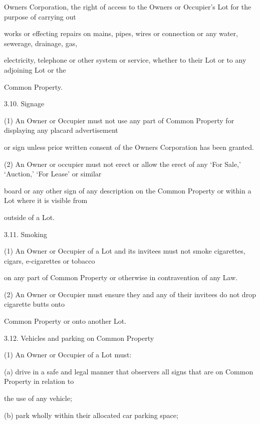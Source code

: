 \documentclass{article}
\begin{document}
{\fontsize{10.02}{1}Owners Corporation, the right of access to the Owners or Occupier’s Lot for the purpose of carrying out }

{\fontsize{10.02}{1}works or effecting repairs on mains, pipes, wires or connection or any water, sewerage, drainage, gas, }

{\fontsize{10.02}{1}electricity, telephone or other system or service, whether to their Lot or to any adjoining Lot or the }

{\fontsize{10.02}{1}Common Property. }

{\fontsize{9.99}{1}3.10. Signage }

{\fontsize{9.962}{1}(1) An Owner or Occupier must not use any part of Common Property for displaying any placard advertisement }

{\fontsize{10.02}{1}or sign unless prior written consent of the Owners Corporation has been granted. }

{\fontsize{9.962}{1}(2) An Owner or occupier must not erect or allow the erect of any ‘For Sale,’ ‘Auction,’ ‘For Lease’ or similar }

{\fontsize{10.02}{1}board or any other sign of any description on the Common Property or within a Lot where it is visible from }

{\fontsize{10.02}{1}outside of a Lot. }

{\fontsize{9.99}{1}3.11. Smoking }

{\fontsize{9.962}{1}(1) An Owner or Occupier of a Lot and its invitees must not smoke cigarettes, cigars, e-cigarettes or tobacco }

{\fontsize{10.02}{1}on any part of Common Property or otherwise in contravention of any Law. }

{\fontsize{9.962}{1}(2) An Owner or Occupier must ensure they and any of their invitees do not drop cigarette butts onto }

{\fontsize{10.02}{1}Common Property or onto another Lot. }

{\fontsize{9.99}{1}3.12. Vehicles and parking on Common Property }

{\fontsize{9.962}{1}(1) An Owner or Occupier of a Lot must: }

{\fontsize{9.962}{1}(a) drive in a safe and legal manner that observers all signs that are on Common Property in relation to }

{\fontsize{10.02}{1}the use of any vehicle; }

{\fontsize{9.962}{1}(b) park wholly within their allocated car parking space; }
\end{document}

